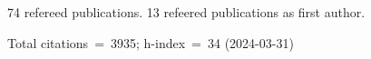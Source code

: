 74 refereed publications. 13 refeered publications as first author.

Total citations~=~3935; h-index~=~34 (2024-03-31)
